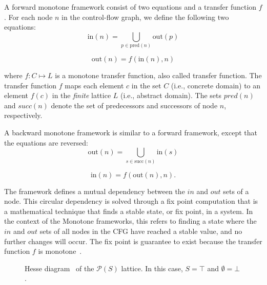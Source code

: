 A forward monotone framework consist of two equations and a transfer function $f$.
For each node $n$ in the control-flow graph, we define the following two equations:
$$\text{in}(n) = \bigcup\limits_{p \in \text{pred}(n)} \text{out}(p)$$

$$\text{out}(n) = f(\text{in}(n), n)$$

where $f:C \mapsto L$ is a monotone transfer function, also called transfer function.
The transfer function $f$ maps each element $c$ in the set $C$ (i.e., concrete domain)
to an element $f(c)$ in the \emph{finite} lattice $L$ (i.e., abstract domain). The sets $pred(n)$ and $succ(n)$
denote the set of predecessors and successors of node $n$, respectively.

A backward monotone framework is similar to a forward framework, except that the equations are reversed:
$$\text{out}(n) = \bigcup\limits_{s \in \text{succ}(n)} \text{in}(s)$$

$$\text{in}(n) = f(\text{out}(n), n).$$

The framework defines a mutual dependency between the $in$ and $out$ sets of a node.
This circular dependency is solved through a fix point computation that is
a mathematical technique that finds a stable state, or fix point, in a system.
In the context of the Monotone frameworks, this
refers to finding a state where the $in$ and $out$ sets of all nodes in the CFG have reached a
stable value, and no further changes will occur. The fix point is guarantee to exist
because the transfer function $f$ is monotone~\cite{Knaster1929}.


\begin{figure}[h]
    \centering
{}
  \caption{\label{fig:lattice}Hesse diagram~\cite{Hesse1874} of the $\mathcal{P}(S)$ lattice.
  In this case, $S = \top$ and $\emptyset = \bot$.}
\end{figure}

